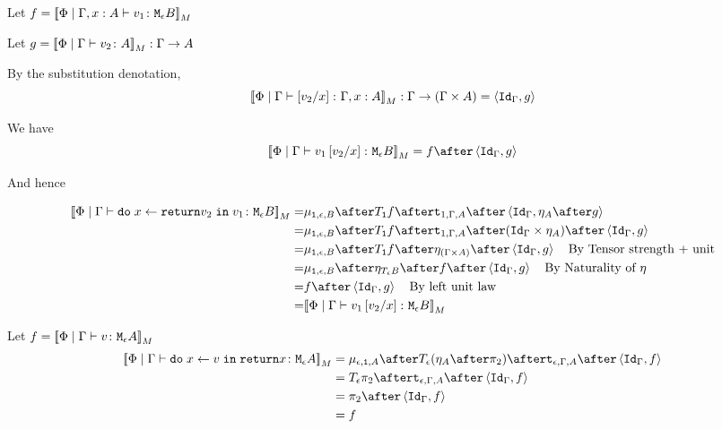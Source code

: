 \documentclass{report}
\begin{document}
Let $f = \deno{\etyperelation{\P}{\gax}{v_1}{\meb}}$

Let $g = \deno{\gpetyperelation{v_2}{A}}: \G \rightarrow A$

By the substitution denotation, $$\deno{\etyperelation{\P}{\G}{\ssub{x}{v_2}}{\gax}}: \G \rightarrow (\G \times A) = \pr{\idg}{g}$$

We have $$\deno{\gpetyperelation{v_1\ssub{x}{v_2}}{\meb}} = f \after \pr{\idg}{g}$$

And hence

\begin{equation}
    \begin{split}
        \deno{\gpetyperelation{\doin{x}{\return{v_2}}{v_1}}{\meb}} = &  \bind{\1}{\e}{B} \after \T{\1}{f} \after \tstrength{1}{\G}{A} \after \pr{\idg}{\point{A}\after g} \\
        = & \bind{\1}{\e}{B} \after \T{\1}{f} \after \tstrength{1}{\G}{A} \after (\idg\times \point{A}) \after \pr{\idg}{g} \\
        = & \bind{\1}{\e}{B} \after \T{\1}{f} \after \point{(\G \times A)} \after \pr{\idg}{g} \qt{By Tensor strength + unit}\\
        = & \bind{\1}{\e}{B}\after\point{\teb}\after f\after\pr{\idg}{g} \qt{By Naturality of $\point{}$}\\
        = & f\after\pr{\idg}{g} \qt{By left unit law}\\
        = & \deno{\gpetyperelation{v_1\ssub{x}{v_2}}{\meb}}\\
    \end{split}
\end{equation}





Let $f = \deno{\gpetyperelation{v}{\mea}}$ 
    \begin{equation}
    \begin{split}
        \deno{\gpetyperelation{\doin{x}{v}{\return{x}}}{\mea}}  & = \bind{\e}{\1}{A} \after \T{\e}{(\point{A} \after \pp)} \after \tstrength{\e}{\G}{A}\after \pr{\idg}{f} \\
        & = \T{\e}{\pp} \after \tstrength{\e}{\G}{A} \after \pr {\idg}{f} \\
        & = \pp \after \pr{\idg}{f}\\
        & = f
    \end{split}
\end{equation}
\end{document}
